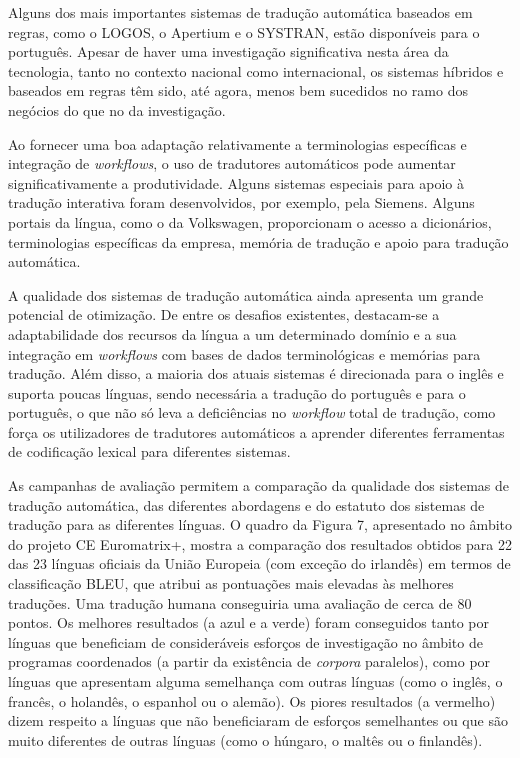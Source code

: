 \documentclass[]{../metanetpaper}
\begin{document}
\begin{multicols}{2}
Alguns dos mais importantes sistemas de tradução automática baseados em regras, como o LOGOS, o Apertium e o SYSTRAN, estão disponíveis para o português. Apesar de haver uma investigação significativa nesta área da tecnologia, tanto no contexto nacional como internacional, os sistemas híbridos e baseados em regras têm sido, até agora, menos bem sucedidos no ramo dos negócios do que no da investigação. 

Ao fornecer uma boa adaptação relativamente a terminologias específicas e integração de \textit{workflows}, o uso de tradutores automáticos pode aumentar significativamente a produtividade. Alguns sistemas especiais para apoio à tradução interativa foram desenvolvidos, por exemplo, pela Siemens. Alguns portais da língua, como o da Volkswagen, proporcionam o acesso a dicionários, terminologias específicas da empresa, memória de tradução e apoio para tradução automática.

A qualidade dos sistemas de tradução automática ainda apresenta um grande potencial de otimização. De entre os desafios existentes, destacam-se a adaptabilidade dos recursos da língua a um determinado domínio e a sua integração em \textit{workflows} com bases de dados terminológicas e memórias para tradução. Além disso, a maioria dos atuais sistemas é direcionada para o inglês e suporta poucas línguas, sendo necessária a tradução do português e para o português, o que não só leva a deficiências no \textit{workflow} total de tradução, como força os utilizadores de tradutores automáticos a aprender diferentes ferramentas de codificação lexical para diferentes sistemas. 

As campanhas de avaliação permitem a comparação da qualidade dos sistemas de tradução automática, das diferentes abordagens e do estatuto dos sistemas de tradução para as diferentes línguas. O quadro da Figura 7, apresentado no âmbito do projeto CE Euromatrix+, mostra a comparação dos resultados obtidos para 22 das 23 línguas oficiais da União Europeia (com exceção do irlandês) em termos de classificação BLEU, que atribui as pontuações mais elevadas às melhores traduções\cite{papieni}.  Uma tradução humana conseguiria uma avaliação de cerca de 80 pontos.
Os melhores resultados (a azul e a verde) foram conseguidos tanto por línguas que beneficiam de consideráveis esforços de investigação no âmbito de programas coordenados (a partir da existência de \textit{corpora} paralelos), como por línguas que apresentam alguma semelhança com outras línguas (como o inglês, o francês, o holandês, o espanhol ou o alemão). Os piores resultados (a vermelho) dizem respeito a línguas que não beneficiaram de esforços semelhantes ou que são muito diferentes de outras línguas (como o húngaro, o maltês ou o finlandês).


\end{multicols}
\end{document}
